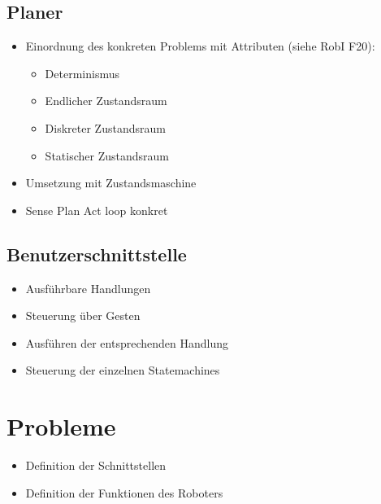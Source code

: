 \subsection{Planer}
\label{planer_integration_sec}

\begin{itemize}
	\item Einordnung des konkreten Problems mit Attributen (siehe RobI F20):
	\begin{itemize}
		\item Determinismus
		\item Endlicher Zustandsraum
		\item Diskreter Zustandsraum
		\item Statischer Zustandsraum
	\end{itemize}
	\item Umsetzung mit Zustandsmaschine
	\item Sense Plan Act loop konkret
\end{itemize}

\subsection{Benutzerschnittstelle}
\label{benutzerschnittstelle_integration_cha}

\begin{itemize}
	\item Ausführbare Handlungen
	\item Steuerung über Gesten
	\item Ausführen der entsprechenden Handlung
	\item Steuerung der einzelnen Statemachines
\end{itemize}

\section{Probleme}
\label{probleme_integration_sec}

\begin{itemize}
	\item Definition der Schnittstellen
	\item Definition der Funktionen des Roboters
\end{itemize}
